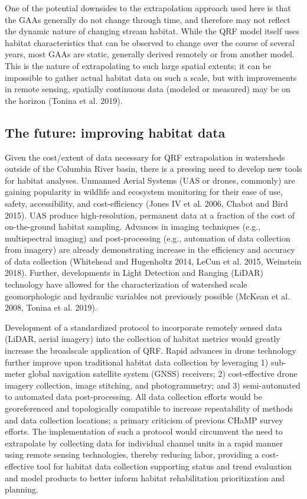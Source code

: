 \documentclass[
  12pt,
]{article}
\begin{document}
One of the potential downsides to the extrapolation approach used here is that the GAAs generally do not change through time, and therefore may not reflect the dynamic nature of changing stream habitat. While the QRF model itself uses habitat characteristics that can be observed to change over the course of several years, most GAAs are static, generally derived remotely or from another model. This is the nature of extrapolating to such large spatial extents; it can be impossible to gather actual habitat data on such a scale, but with improvements in remote sensing, spatially continuous data (modeled or measured) may be on the horizon (Tonina et al. 2019).

\hypertarget{the-future-improving-habitat-data}{%
\subsection{The future: improving habitat data}\label{the-future-improving-habitat-data}}

Given the cost/extent of data necessary for QRF extrapolation in watersheds outside of the Columbia River basin, there is a pressing need to develop new tools for habitat analyses. Unmanned Aerial Systems (UAS or drones, commonly) are gaining popularity in wildlife and ecosystem monitoring for their ease of use, safety, accessibility, and cost-efficiency (Jones IV et al. 2006, Chabot and Bird 2015). UAS produce high-resolution, permanent data at a fraction of the cost of on-the-ground habitat sampling. Advances in imaging techniques (e.g., multispectral imaging) and post-processing (e.g., automation of data collection from imagery) are already demonstrating increase in the efficiency and accuracy of data collection (Whitehead and Hugenholtz 2014, LeCun et al. 2015, Weinstein 2018). Further, developments in Light Detection and Ranging (LiDAR) technology have allowed for the characterization of watershed scale geomorphologic and hydraulic variables not previously possible (McKean et al. 2008, Tonina et al. 2019).

Development of a standardized protocol to incorporate remotely sensed data (LiDAR, aerial imagery) into the collection of habitat metrics would greatly increase the broadscale application of QRF. Rapid advances in drone technology further improve upon traditional habitat data collection by leveraging 1) sub-meter global navigation satellite system (GNSS) receivers; 2) cost-effective drone imagery collection, image stitching, and photogrammetry; and 3) semi-automated to automated data post-processing. All data collection efforts would be georeferenced and topologically compatible to increase repeatability of methods and data collection locations; a primary criticism of previous CHaMP survey efforts. The implementation of such a protocol would circumvent the need to extrapolate by collecting data for individual channel units in a rapid manner using remote sensing technologies, thereby reducing labor, providing a cost-effective tool for habitat data collection supporting status and trend evaluation and model products to better inform habitat rehabilitation prioritization and planning.
\end{document}
